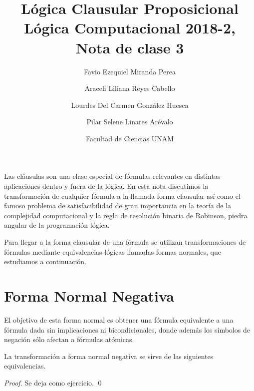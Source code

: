 \documentclass[11pt,letterpaper]{article}
\title{L\'ogica Clausular Proposicional \\ 
L\'ogica Computacional 2018-2, Nota de clase 3}
\author{Favio Ezequiel Miranda Perea\and Araceli Liliana Reyes Cabello\and
Lourdes Del Carmen Gonz\'alez Huesca \and Pilar Selene Linares Ar\'evalo}
\date{Facultad de Ciencias UNAM}
\begin{document}
\maketitle

Las cláusulas son una clase especial de fórmulas relevantes en distintas 
aplicaciones dentro y fuera de la lógica. En esta nota discutimos la 
transformación de cualquier fórmula a la llamada forma clausular así como el 
famoso problema de satisfacibilidad {\sat} de gran importancia en la teoría 
de la complejidad computacional y la regla de resolución binaria de 
Robinson, piedra angular de la programación lógica.


Para llegar a la forma clausular de una fórmula  se utilizan transformaciones 
de fórmulas mediante equivalencias lógicas llamadas formas normales, que 
estudiamos a continuación.


\section{Forma Normal Negativa}

El objetivo de esta forma normal es obtener una f\'ormula equivalente a una
f\'ormula dada sin implicaciones ni bicondicionales, donde además los símbolos 
de negación sólo afectan a f\'ormulas at\'omicas.


\noindent La transformación a forma normal negativa se sirve de las siguientes 
equivalencias.

\vspace*{-10pt}
\begin{proof} 
Se deja como ejercicio.
\qed
\end{proof}
\end{document}
